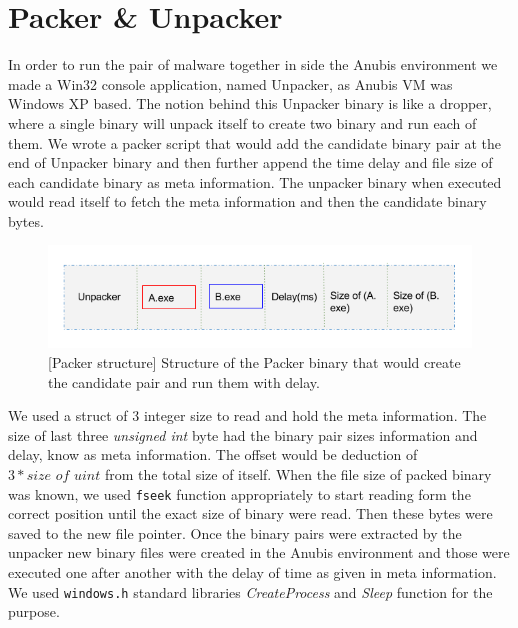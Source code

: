 \section{Packer \& Unpacker}
\label{sec:packerunpacker}
In order to run the pair of malware together in side the Anubis environment we made a Win32 console application, named Unpacker, as Anubis VM was Windows XP based. The notion behind this Unpacker binary is like a dropper, where a single binary will unpack itself to create two binary and run each of them.
We wrote a packer script that would add the candidate binary pair at the end of Unpacker binary and then further append the time delay and file size of each candidate binary as meta information.
The unpacker binary when executed would read itself to fetch the meta information and then the candidate binary bytes.\\
\begin{figure}[htbp]
\begin{center}
  \includegraphics[scale=0.5]{figures/unpacker.png}
\end{center}
\caption{[Packer structure] Structure of the Packer binary that would create the candidate pair and run them with delay.}
\label{fig:unpacker}
\end{figure}
We used a struct of 3 integer size to read and hold the meta information. The size of last three \textit{unsigned int} byte had the binary pair sizes information and delay, know as meta information. The offset would be deduction of $3 * \textit{size of uint}$ from the total size of itself. When the file size of packed binary was known, we used \texttt{fseek\(\)} function appropriately to start reading form the correct position until the exact size of binary were read. Then these bytes were saved to the new file pointer. Once the binary pairs were extracted by the unpacker new binary files were created in the Anubis environment and those were executed one after another with the delay of time as given in meta information. We used \texttt{windows.h} standard libraries \emph{CreateProcess} and \emph{Sleep} function for the purpose.\\

